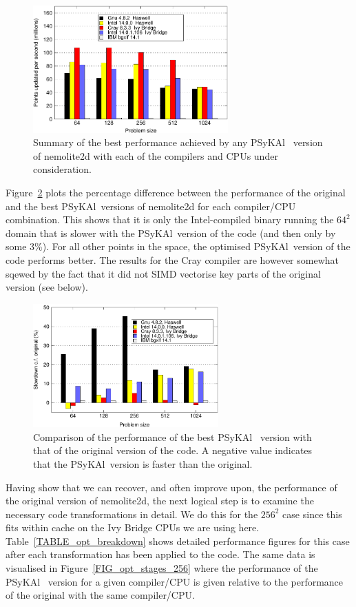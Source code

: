 \documentclass[journal]{IEEEtran}
\newcommand{\psykal}{{PS}y{KA}l\ }
\begin{document}
\begin{figure}[!t]
\centering
\includegraphics[width=7.5cm]{best_psykal_summary}
\caption{Summary of the best performance achieved by any \psykal 
version of nemolite2d with each of the compilers and CPUs under 
consideration.}
\label{FIG_best_psykal_perf_summary}
\end{figure}

Figure~\ref{FIG_slowdown_summary} plots the percentage difference
between the performance of the original and the best \psykal versions
of nemolite2d for each compiler/CPU combination. This shows that it is
only the Intel-compiled binary running the $64^2$ domain that is
slower with the \psykal version of the code (and then only by some
3\%). For all other points in the space, the optimised \psykal version
of the code performs better. The results for the Cray compiler are
however somewhat sqewed by the fact that it did not SIMD vectorise key
parts of the original version (see below).

\begin{figure}[!t]
\centering
\includegraphics[width=2.8in]{slowdown_summary}
\caption{Comparison of the performance of the best \psykal
version with that of the original version of the code. A negative value 
indicates that the \psykal version is faster than the original.}
\label{FIG_slowdown_summary}
\end{figure}

Having show that we can recover, and often improve upon, the
performance of the original version of nemolite2d, the next logical
step is to examine the necessary code transformations in detail.  We
do this for the $256^{2}$ case since this fits within cache on the Ivy
Bridge CPUs we are using here.  Table~\ref{TABLE_opt_breakdown} shows
detailed performance figures for this case after each transformation has been
applied to the code. The same data is visualised in
Figure~\ref{FIG_opt_stages_256} where the performance of the \psykal
version for a given compiler/CPU is given relative to the performance
of the original with the same compiler/CPU.
\end{document}
